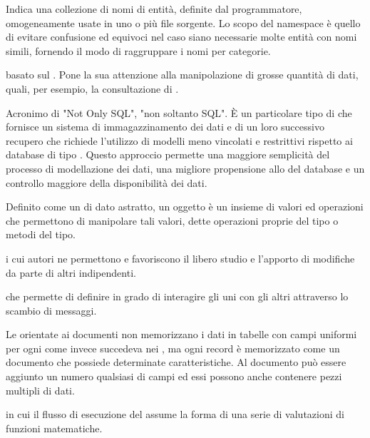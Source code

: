 
{Indica una collezione di nomi di entità, definite dal programmatore, omogeneamente usate in uno o più file sorgente. Lo scopo del namespace è quello di evitare confusione ed equivoci nel caso siano necessarie molte entità con nomi simili, fornendo il modo di raggruppare i nomi per categorie.}

{ basato sul  . Pone la sua attenzione alla manipolazione di grosse quantità di dati, quali, per esempio, la consultazione di .}

{Acronimo di "Not Only SQL", "non soltanto SQL". \`{E} un particolare tipo di  che fornisce un sistema di immagazzinamento dei dati e di un loro successivo recupero che richiede l'utilizzo di modelli meno vincolati e restrittivi rispetto ai database di tipo . Questo approccio permette una maggiore semplicità del processo di modellazione dei dati, una migliore propensione allo  del database e un controllo maggiore della disponibilità dei dati.}




{Definito come un  di dato astratto, un oggetto è un insieme di valori ed operazioni che permettono di manipolare tali valori, dette operazioni proprie del tipo o metodi del tipo.}

{ i cui autori ne permettono e favoriscono il libero studio e l'apporto di modifiche da parte di altri  indipendenti.}

{ che permette di definire  in grado di interagire gli uni con gli altri attraverso lo scambio di messaggi.}

{Le  orientate ai documenti non memorizzano i dati in tabelle con campi uniformi per ogni  come invece succedeva nei  , ma ogni record è memorizzato come un documento che possiede determinate caratteristiche. Al documento può essere aggiunto un numero qualsiasi di campi ed essi possono anche contenere pezzi multipli di dati.}

{ in cui il flusso di esecuzione del  assume la forma di una serie di valutazioni di funzioni matematiche.}

